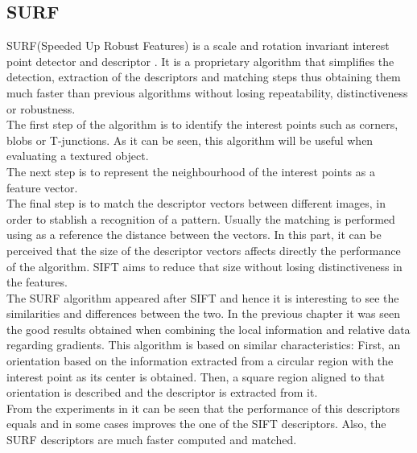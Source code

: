 \subsection{SURF}
SURF(Speeded Up Robust Features) is a scale and rotation invariant interest point detector and descriptor \cite{surf}. 
It is a proprietary algorithm that simplifies the detection, extraction of the descriptors and matching steps thus obtaining them much faster than previous algorithms without losing repeatability, distinctiveness or robustness. 
\\

The first step of the algorithm is to identify the interest points such as corners, blobs or T-junctions. As it can be seen, this algorithm will be useful when evaluating a textured object. 
\\

The next step is to represent the neighbourhood of the interest points as a feature vector. 
\\

The final step is to match the descriptor vectors between different images, in order to stablish a recognition of a pattern. Usually the matching is performed using as a reference the distance between the vectors. 
In this part, it can be perceived that the size of the descriptor vectors affects directly the performance of the algorithm. SIFT aims to reduce that size without losing distinctiveness in the features. 
\\

The SURF algorithm appeared after SIFT and hence it is interesting to see the similarities and differences between the two. In the previous chapter it was seen the good results obtained when combining the local information and relative data regarding gradients. This algorithm is based on similar characteristics: 
First, an orientation based on the information extracted from a circular region with the interest point as its center is obtained. Then, a square region aligned to that orientation is described and the descriptor is extracted from it.  
\\

From the experiments in \cite{surf} it can be seen that the performance of this descriptors equals and in some cases improves the one of the SIFT descriptors. Also, the SURF descriptors are much faster computed and matched. 


